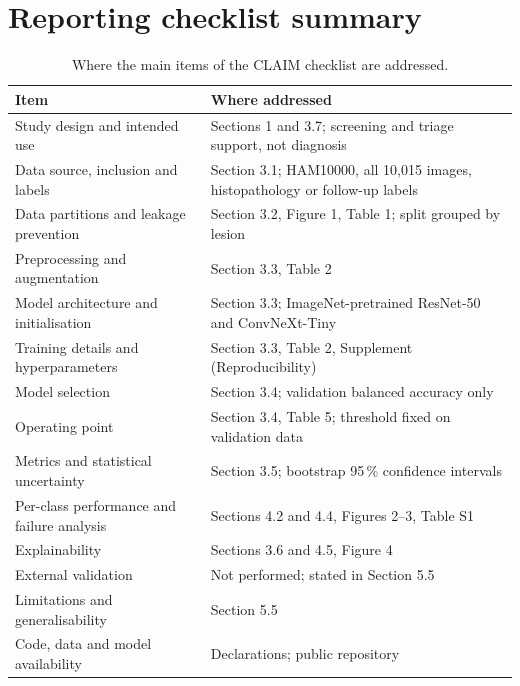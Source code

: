\documentclass[11pt,a4paper]{article}
\newcommand{\pct}{\,\%}
\begin{document}
\section*{Reporting checklist summary}
\begin{table}[H]
\centering
\caption{Where the main items of the CLAIM checklist \cite{mongan2020} are addressed.}
\small
\begin{tabularx}{\textwidth}{@{}lX@{}}
\toprule
Item & Where addressed \\
\midrule
Study design and intended use & Sections 1 and 3.7; screening and triage support, not diagnosis \\
Data source, inclusion and labels & Section 3.1; HAM10000, all 10,015 images, histopathology or follow-up labels \\
Data partitions and leakage prevention & Section 3.2, Figure 1, Table 1; split grouped by lesion \\
Preprocessing and augmentation & Section 3.3, Table 2 \\
Model architecture and initialisation & Section 3.3; ImageNet-pretrained ResNet-50 and ConvNeXt-Tiny \\
Training details and hyperparameters & Section 3.3, Table 2, Supplement (Reproducibility) \\
Model selection & Section 3.4; validation balanced accuracy only \\
Operating point & Section 3.4, Table 5; threshold fixed on validation data \\
Metrics and statistical uncertainty & Section 3.5; bootstrap 95\pct{} confidence intervals \\
Per-class performance and failure analysis & Sections 4.2 and 4.4, Figures 2--3, Table S1 \\
Explainability & Sections 3.6 and 4.5, Figure 4 \\
External validation & Not performed; stated in Section 5.5 \\
Limitations and generalisability & Section 5.5 \\
Code, data and model availability & Declarations; public repository \\
\bottomrule
\end{tabularx}
\end{table}
\end{document}
